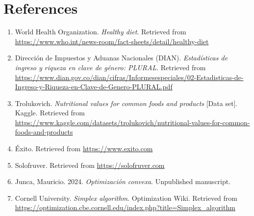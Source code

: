 \documentclass[10pt]{article}
\begin{document}
\section{References}

\begin{enumerate}
    \item World Health Organization. \textit{Healthy diet}. Retrieved from \url{https://www.who.int/news-room/fact-sheets/detail/healthy-diet}
    
    \item Dirección de Impuestos y Aduanas Nacionales (DIAN). \textit{Estadísticas de ingreso y riqueza en clave de género: PLURAL}. Retrieved from \url{https://www.dian.gov.co/dian/cifras/Informesespeciales/02-Estadisticas-de-Ingreso-y-Riqueza-en-Clave-de-Genero-PLURAL.pdf}
    
    \item Trolukovich. \textit{Nutritional values for common foods and products} [Data set]. Kaggle. Retrieved from \url{https://www.kaggle.com/datasets/trolukovich/nutritional-values-for-common-foods-and-products}
    
    \item Éxito. Retrieved from \url{https://www.exito.com}
    
    \item Solofruver. Retrieved from \url{https://solofruver.com}
    
    \item Junca, Mauricio. 2024. \textit{Optimización convexa}. Unpublished manuscript.
        
    \item Cornell University. \textit{Simplex algorithm}. Optimization Wiki. Retrieved from \url{https://optimization.cbe.cornell.edu/index.php?title=Simplex_algorithm}
\end{enumerate}
\end{document}
